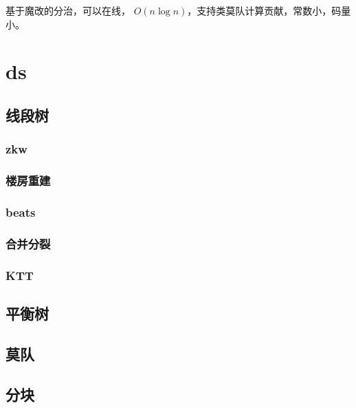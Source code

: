 \documentclass[12pt]{ctexart}
\begin{document}
基于魔改的分治，可以在线， $O(n\log n)$，支持类莫队计算贡献，常数小，码量小。



\newpage

\section{ds}

\subsection{线段树}

\subsubsection{zkw}

\subsubsection{楼房重建}



\subsubsection{beats}

\subsubsection{合并分裂}



\subsubsection{KTT}

\subsection{平衡树}

\subsection{莫队}

\subsection{分块}
\end{document}
